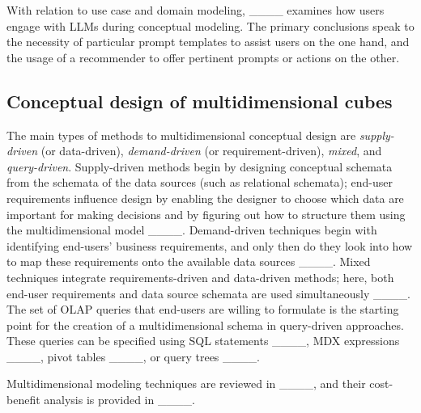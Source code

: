 With relation to use case and domain modeling, ____ examines how users engage with LLMs during conceptual modeling. The primary conclusions speak to the necessity of particular prompt templates to assist users on the one hand, and the usage of a recommender to offer pertinent prompts or actions on the other.


\subsection{Conceptual design of multidimensional cubes}

The main types of methods to multidimensional conceptual design are \emph{supply-driven} (or data-driven), \emph{demand-driven} (or requirement-driven), \emph{mixed}, and \emph{query-driven}. Supply-driven methods begin by designing conceptual schemata from the schemata of the data sources (such as relational schemata); end-user requirements influence design by enabling the designer to choose which data are important for making decisions and by figuring out how to structure them using the multidimensional model ____. Demand-driven techniques begin with identifying end-users' business requirements, and only then do they look into how to map these requirements onto the available data sources ____.
Mixed techniques integrate requirements-driven and data-driven methods; here, both end-user requirements and data source schemata are used simultaneously ____. The set of OLAP queries that end-users are willing to formulate is the starting point for the creation of a multidimensional schema in query-driven approaches. These queries can be specified using SQL statements ____, MDX expressions ____, pivot tables ____, or query trees ____.

Multidimensional modeling techniques are reviewed in ____, and their cost-benefit analysis is provided in ____.